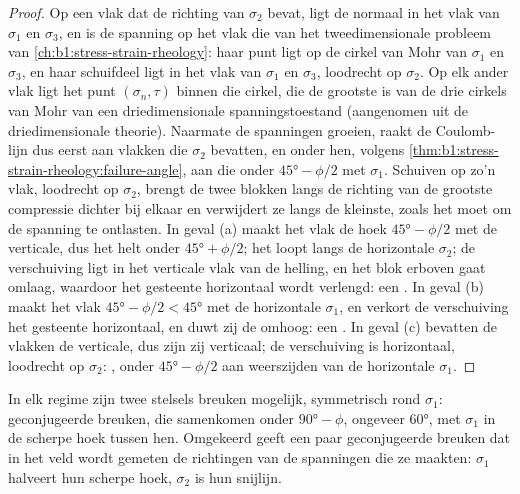\begin{proof}
Op een vlak dat de richting van $\sigma_2$ bevat, ligt de normaal in het vlak van $\sigma_1$ en $\sigma_3$, en is de spanning op het vlak die van het tweedimensionale probleem van \cref{ch:b1:stress-strain-rheology}: haar punt ligt op de cirkel van Mohr van $\sigma_1$ en $\sigma_3$, en haar schuifdeel ligt in het vlak van $\sigma_1$ en $\sigma_3$, loodrecht op $\sigma_2$. Op elk
ander vlak ligt het punt $(\sigma_n, \tau)$ binnen die cirkel, die de grootste is van de drie cirkels van Mohr van een driedimensionale spanningstoestand (aangenomen uit de driedimensionale theorie). Naarmate de spanningen groeien, raakt de Coulomb-lijn dus eerst aan vlakken die $\sigma_2$ bevatten, en onder hen, volgens \cref{thm:b1:stress-strain-rheology:failure-angle}, aan die onder $\ang{45} - \phi/2$ met $\sigma_1$. Schuiven op zo'n vlak, loodrecht op $\sigma_2$, brengt de twee blokken langs de richting van de grootste compressie dichter bij elkaar en verwijdert ze langs de kleinste, zoals het moet om de spanning te ontlasten. In geval (a) maakt het vlak de hoek $\ang{45} - \phi/2$ met de verticale, dus het helt onder $\ang{45} + \phi/2$; het loopt langs de horizontale $\sigma_2$; de verschuiving ligt in het verticale vlak van de helling, en het blok erboven gaat omlaag, waardoor het gesteente horizontaal wordt verlengd: een . In geval (b) maakt het vlak $\ang{45} - \phi/2 < \ang{45}$ met de horizontale $\sigma_1$, en verkort de verschuiving het gesteente horizontaal, en duwt zij de  omhoog: een . In geval (c) bevatten de vlakken de verticale, dus zijn zij verticaal; de verschuiving is horizontaal, loodrecht op $\sigma_2$: , onder $\ang{45} - \phi/2$ aan weerszijden van de horizontale $\sigma_1$.
\end{proof}

In elk regime zijn twee stelsels breuken mogelijk, symmetrisch rond $\sigma_1$: geconjugeerde breuken, die samenkomen onder $\ang{90} - \phi$, ongeveer \ang{60}, met $\sigma_1$ in de scherpe hoek tussen hen. Omgekeerd geeft een paar geconjugeerde breuken dat in het veld wordt gemeten de richtingen van de spanningen die ze maakten: $\sigma_1$ halveert hun scherpe hoek, $\sigma_2$ is hun snijlijn.

